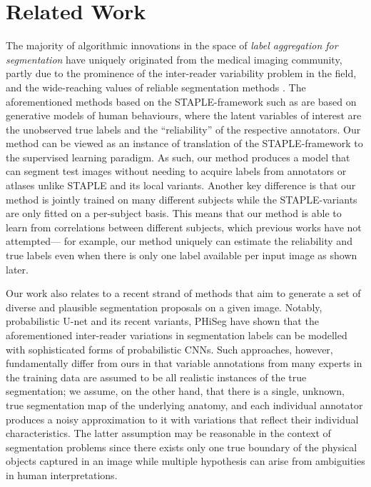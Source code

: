 \section{Related Work}
\vspace{-2mm}

The majority of algorithmic innovations in the space of \textit{label aggregation for segmentation} have uniquely originated from the medical imaging community, partly due to the prominence of the inter-reader variability problem in the field, and the wide-reaching values of reliable segmentation methods \cite{asman2012formulating}. The aforementioned methods based on the STAPLE-framework such as \cite{warfield2004simultaneous,asman2011robust,asman2012formulating,cardoso2013steps,weisenfeld2011learning,asman2013non,asman2013non,akhondi2014logarithmic,joskowicz2018automatic} are based on generative models of human behaviours, where the latent variables of interest are the unobserved true labels and the ``reliability'' of the respective annotators. Our method can be viewed as an instance of translation of the STAPLE-framework to the supervised learning paradigm. As such, our method produces a model that can segment test images without needing to acquire labels from annotators or atlases unlike STAPLE and its local variants. Another key difference is that our method is jointly trained on many different subjects while the STAPLE-variants are only fitted on a per-subject basis. This means that our method is able to learn from correlations between different subjects, which previous works have not attempted--- for example, our method uniquely can estimate the reliability and true labels even when there is only one label available per input image as shown later. 

Our work also relates to a recent strand of methods that aim to generate a set of diverse and plausible segmentation proposals on a given image. Notably, probabilistic U-net \cite{kohl2018probabilistic} and its recent variants, PHiSeg \cite{baumgartner2019phiseg} have shown that the aforementioned inter-reader variations in segmentation labels can be modelled with sophisticated forms of probabilistic CNNs. Such approaches, however, fundamentally differ from ours in that variable annotations from many experts in the training data are assumed to be all realistic instances of the true segmentation; we assume, on the other hand, that there is a single, unknown, true segmentation map of the underlying anatomy, and each individual annotator produces a noisy approximation to it with variations that reflect their individual characteristics. The latter assumption may be reasonable in the context of segmentation problems since there exists only one true boundary of the physical objects captured in an image while multiple hypothesis can arise from ambiguities in human interpretations.

